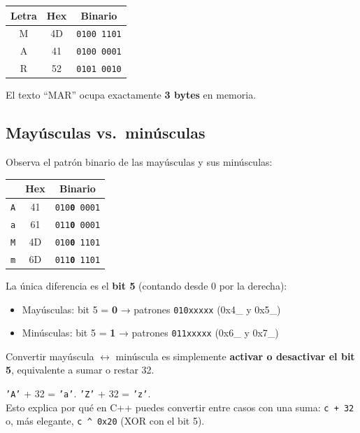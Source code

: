 \documentclass[12pt, oneside]{article}
\begin{document}
\begin{ejemplo}
\begin{center}
\begin{tabular}{ccc}
  \toprule
  \textbf{Letra} & \textbf{Hex} & \textbf{Binario} \\
  \midrule
  M & 4D & \texttt{0100 1101} \\
  A & 41 & \texttt{0100 0001} \\
  R & 52 & \texttt{0101 0010} \\
  \bottomrule
\end{tabular}
\end{center}
El texto ``MAR'' ocupa exactamente \textbf{3 bytes} en memoria.
\end{ejemplo}

\subsection{Mayúsculas vs.\ minúsculas}

Observa el patrón binario de las mayúsculas y sus minúsculas:

\begin{center}
\begin{tabular}{ccc}
  \toprule
  & \textbf{Hex} & \textbf{Binario} \\
  \midrule
  \texttt{A} & 41 & \texttt{010\textbf{0} 0001} \\
  \texttt{a} & 61 & \texttt{011\textbf{0} 0001} \\
  \midrule
  \texttt{M} & 4D & \texttt{010\textbf{0} 1101} \\
  \texttt{m} & 6D & \texttt{011\textbf{0} 1101} \\
  \bottomrule
\end{tabular}
\end{center}

La única diferencia es el \textbf{bit 5} (contando desde 0 por la derecha):
\begin{itemize}
  \item Mayúsculas: bit 5 = \textbf{0} → patrones \texttt{010xxxxx} (0x4\_ y 0x5\_)
  \item Minúsculas: bit 5 = \textbf{1} → patrones \texttt{011xxxxx} (0x6\_ y 0x7\_)
\end{itemize}

Convertir mayúscula $\leftrightarrow$ minúscula es simplemente \textbf{activar o desactivar el bit 5},
equivalente a sumar o restar 32.

\begin{consejo}
  \texttt{'A'} + 32 = \texttt{'a'}. \quad \texttt{'Z'} + 32 = \texttt{'z'}. \\
  Esto explica por qué en C++ puedes convertir entre casos con una suma:
  \texttt{c + 32} o, más elegante, \texttt{c \textasciicircum{} 0x20}
  (XOR con el bit 5).
\end{consejo}
\end{document}
